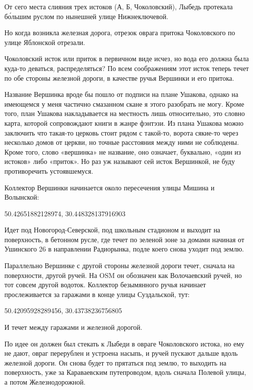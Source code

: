 
От сего места слияния трех истоков (А, Б, Чоколовский), Лыбедь протекала б\'ольшим руслом по нынешней улице Нижнеключевой.

Но когда возникла железная дорога, отрезок оврага притока Чоколовского по улице Яблонской отрезали.

Чоколовский исток или приток в первичном виде исчез, но вода его должна была куда-то деваться, распределяться? По всем соображениям этот исток теперь течет по обе стороны железной дороги, в качестве ручья Вершинки и его притока.

Название Вершинка вроде бы пошло от подписи на плане Ушакова, однако на имеющемся у меня частично смазанном скане я этого разобрать не могу. Кроме того, план Ушакова накладывается на местность лишь относительно, это словно карта, которой сопровождают книги в жанре фэнтэзи. Из плана Ушакова можно заключить что такая-то церковь стоит рядом с такой-то, ворота сякие-то через несколько домов от церкви, но точные расстояния между ними не соблюдены. Кроме того, слово «вершинка» не название, оно означает, буквально, «один из истоков» либо «приток». Но раз уж называют сей исток Вершинкой, не буду противоречить устоявшемуся.

Коллектор Вершинки начинается около пересечения улицы Мишина и Волынской:

50.42651882128974, 30.448328137916903

Идет под Новогород-Северской, под школьным стадионом и выходит на поверхность, в бетонном русле, где течет по зеленой зоне за домами начиная от Ушинского 26 в направлении Радиорынка, подле коего снова уходит под землю.

Параллельно Вершинке с другой стороны железной дороги течет, сначала на поверхности, другой ручей. На OSM он обозначен как Волочаевский ручей, но тот совсем другой водоток. Коллектор безымянного ручья начинает прослеживается за гаражами в конце улицы Суздальской, тут: 

50.42095928289456, 30.43738236756805

И течет между гаражами и железной дорогой.

По идее он должен был стекать к Лыбеди в овраге Чоколовского истока, но ему не дают, овраг перерублен и устроена насыпь, и ручей 
пускают дальше вдоль железной дороги. Он снова будет то прятаться под землю, то выходить на поверхность, уже за Караваевским путепроводом, вдоль сначала Полевой улицы, а потом Железнодорожной.

